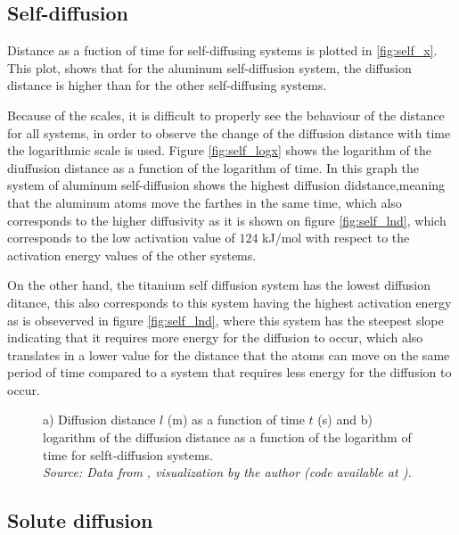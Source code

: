 \subsection{Self-diffusion}

Distance as a fuction of time for self-diffusing systems is plotted in \ref{fig:self_x}. This plot, shows that for the aluminum self-diffusion system, the diffusion distance is higher than for the other self-diffusing systems. 

Because of the scales, it is difficult to properly see the behaviour of the distance for all systems, in order to observe the change of the diffusion distance with time the logarithmic scale is used. Figure \ref{fig:self_logx} shows the logarithm of the diuffusion distance as a function of the logarithm of time. In this graph the system of aluminum self-diffusion shows the highest diffusion didstance,meaning that the aluminum atoms move the farthes in the same time, which also corresponds to the higher diffusivity as it is shown on figure \ref{fig:self_lnd}, which corresponds to the low activation value of $124$ kJ/mol with respect to the activation energy values of the other systems.

On the other hand, the titanium self diffusion system has the lowest diffusion ditance, this also corresponds to this system having the highest activation energy as is obseverved in figure \ref{fig:self_lnd}, where this system has the steepest slope indicating that it requires more energy for the diffusion to occur, which also translates in a lower value for the distance that the atoms can move on the same period of time compared to a system that requires less energy for the diffusion to occur. 

\begin{figure}[h]
 \centering
 \caption{a) Diffusion distance $l$ (m) as a function of time $t$ (s) and b) logarithm of the diffusion distance as a function of the logarithm of time for selft-diffusion systems. \\
 \textit{Source: Data from \citep{kakusan}, visualization by the author (code available at \citep{mygit}).}}
 \label{fig:self_length}
\end{figure}


\subsection{Solute diffusion}

